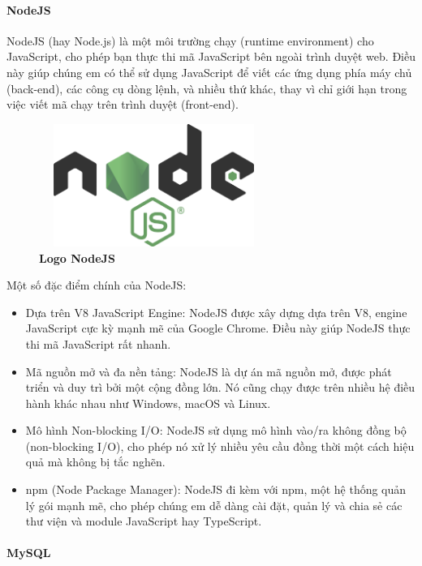 \paragraph{NodeJS}
\mbox{}

NodeJS (hay Node.js) là một môi trường chạy (runtime environment) cho JavaScript, cho phép bạn thực thi mã JavaScript bên ngoài trình duyệt web. Điều này giúp chúng em có thể sử dụng JavaScript để viết các ứng dụng phía máy chủ (back-end), các công cụ dòng lệnh, và nhiều thứ khác, thay vì chỉ giới hạn trong việc viết mã chạy trên trình duyệt (front-end).

\begin{figure}[H]
	\centering
	\includegraphics[width=7.5cm,height=4cm]{Images/Technology/nodejs.png}
	\caption[Logo NodeJS]{\bfseries \fontsize{12pt}{0pt}
		\selectfont Logo NodeJS}
	\label{nodejs} %
\end{figure}

Một số đặc điểm chính của NodeJS:
\begin{itemize}
	\item Dựa trên V8 JavaScript Engine: NodeJS được xây dựng dựa trên V8, engine JavaScript cực kỳ mạnh mẽ của Google Chrome. Điều này giúp NodeJS thực thi mã JavaScript rất nhanh.
	\item Mã nguồn mở và đa nền tảng: NodeJS là dự án mã nguồn mở, được phát triển và duy trì bởi một cộng đồng lớn. Nó cũng chạy được trên nhiều hệ điều hành khác nhau như Windows, macOS và Linux.
	\item Mô hình Non-blocking I/O: NodeJS sử dụng mô hình vào/ra không đồng bộ (non-blocking I/O), cho phép nó xử lý nhiều yêu cầu đồng thời một cách hiệu quả mà không bị tắc nghẽn.
	\item npm (Node Package Manager): NodeJS đi kèm với npm, một hệ thống quản lý gói mạnh mẽ, cho phép chúng em dễ dàng cài đặt, quản lý và chia sẻ các thư viện và module JavaScript hay TypeScript.
\end{itemize}

\paragraph{MySQL}
\mbox{}

